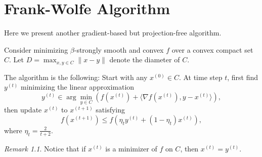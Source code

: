 \documentclass[openany]{book}
\newtheorem{theorem}{Theorem}[chapter]
\theoremstyle{definition}
\theoremstyle{remark}
\newtheorem*{remark}{Remark}
\begin{document}
\begin{comment}
\section{Randomized Block Coordinate Gradient Descent}
Here at step $t$, we pick coordinate $i$ as $i_t$ with probability $\frac{\beta_i}{\sum_{i=1}^n\beta_i}$, and the step size is $\frac{1}{\beta_{i_t}}$. One can then prove that, conditioned on $x^{(t)}$,
\begin{equation}
    f(x^{(t)})-\mathbb{E}[f(x^{(t+1)})]\ge \frac{1}{2\sum_{i=1}^{n}\beta_i}\|\nabla f(x^{(t)})\|_2^2.
\end{equation}
However, to continue one need the following value:
\begin{equation}
    R_0=\max\{\|x-x^{\star}\|_2|f(x)\le f(x^{(0)})\}.
\end{equation}
In fact the function value decreases at each step, and the above value is enough to capture the initial distance from $x^{\star}$. Then we have, for a specific $x^{(t)}$,
\begin{equation}
    R_0\|\nabla f(x^{(t)})\|_2\ge f(x^{(t)})-f(x^{\star}).
\end{equation}
Since $\mathbb{E}[\|\nabla f(x^{(t)})\|_2^2]\ge \mathbb{E}[\|\nabla f(x^{(t)})\|_2]^2$, we have
\begin{theorem}
    If $f$ is $\beta$-strongly smooth and convex, then
    \begin{equation}
        \mathbb{E}[f(x^{(t)})]-f(x^{\star})\le \frac{(2 \sum_{i=1}^{n}\beta_i)R_0^2}{t}.
    \end{equation}
    If $f$ is further $\alpha$-strongly convex, then
    \begin{equation}
        \mathbb{E}[f(x^{(t)})]-f(x^{\star})\le(1-\frac{\alpha}{\sum_{i=1}^{n}\beta_i})^t(f(x^{(0)})-f(x^{\star})).
    \end{equation}
\end{theorem}
\end{comment}

\chapter{Frank-Wolfe Algorithm}
Here we present another gradient-based but projection-free algorithm.

Consider minimizing $\beta$-strongly smooth and convex $f$ over a convex compact set $C$. Let $D=\max_{x,y\in C}\|x-y\|$ denote the diameter of $C$.

The algorithm is the following: Start with any $x^{(0)}\in C$. At time step $t$, first find $y^{(t)}$ minimizing the linear approximation
\begin{equation}\label{linApprox}
    y^{(t)}\in\arg\min_{y\in C}\left(f(x^{(t)})+\langle\nabla f(x^{(t)}),y-x^{(t)}\rangle\right),
\end{equation}
then update $x^{(t)}$ to $x^{(t+1)}$ satisfying
\begin{equation}
    f(x^{(t+1)})\le f(\eta_ty^{(t)}+(1-\eta_t)x^{(t)}),
\end{equation}
where $\eta_t=\frac{2}{t+2}$.
\begin{remark}
    Notice that if $x^{(t)}$ is a minimizer of $f$ on $C$, then $x^{(t)}=y^{(t)}$.
\end{remark}
\end{document}
